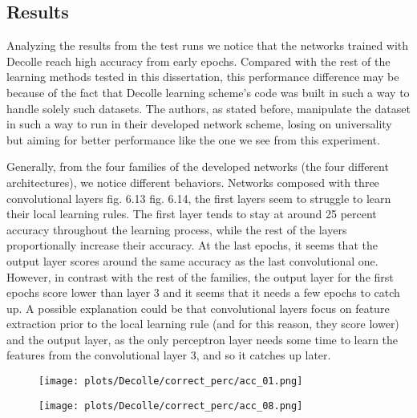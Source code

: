 \documentclass[12pt]{report}
\begin{document}
\subsection{Results}

Analyzing the results from the test runs we notice that the networks trained with Decolle reach high accuracy from early epochs. Compared with the rest of the learning methods tested in this dissertation, this performance difference may be because of the fact that Decolle learning scheme's code was built in such a way to handle solely such datasets. The authors, as stated before, manipulate the dataset in such a way to run in their developed network scheme, losing on universality but aiming for better performance like the one we see from this experiment.

Generally, from the four families of the developed networks (the four different architectures), we notice different behaviors. Networks composed with three convolutional layers fig. 6.13 fig. 6.14, the first layers seem to struggle to learn their local learning rules. The first layer tends to stay at around 25 percent accuracy throughout the learning process, while the rest of the layers proportionally increase their accuracy. At the last epochs, it seems that the output layer scores around the same accuracy as the last convolutional one. However, in contrast with the rest of the families, the output layer for the first epochs score lower than layer 3 and it seems that it needs a few epochs to catch up. A possible explanation could be that convolutional layers focus on feature extraction prior to the local learning rule (and for this reason, they score lower) and the output layer, as the only perceptron layer needs some time to learn the features from the convolutional layer 3, and so it catches up later.

\begin{figure}
\centering
\begin{minipage}{.4\textwidth}
  \centering
  \texttt{[image: plots/Decolle/correct\_perc/acc\_01.png]}
  \label{fig:test1}
\end{minipage}
\begin{minipage}{.4\textwidth}
  \centering
  \texttt{[image: plots/Decolle/correct\_perc/acc\_08.png]}
  \label{fig:test2}
\end{minipage}
\end{figure}
\end{document}

